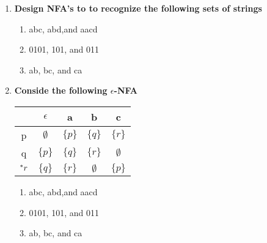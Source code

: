 \begin{enumerate}
\begin{enumerate}
	\item \textbf{Design NFA's to to recognize the following sets of strings}
		\begin{enumerate}
			\item abc, abd,and aacd 
			\item 0101, 101, and 011
			\item ab, bc, and ca 
		\end{enumerate}

	\item \textbf{Conside the following $\epsilon$-NFA}
	
		\begin{table}[]
		\begin{tabular}{c||c|c|c|c}
			&  $\epsilon$ &  a   & b & c\\ \hline
			p&  $\emptyset$ &  $\{p\}$  & $\{q\}$& $\{r\}$ \\ \hline
			q&  $\{p\}$& $\{q\}$   & $\{r\}$ &  $\emptyset$\\ \hline
			${}^\ast r$&  $\{q\}$& $\{r\}$ &  $\emptyset$ & $\{p\}$ \\ \hline
		\end{tabular}
	\end{table}

			\begin{enumerate}
		\item abc, abd,and aacd 
		\item 0101, 101, and 011
		\item ab, bc, and ca 
	\end{enumerate}
\end{enumerate}

\end{enumerate}


